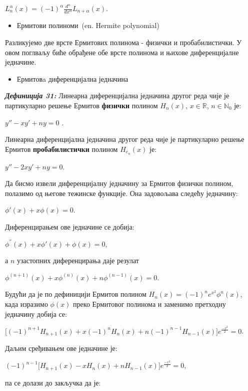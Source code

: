\(L_{n}^{\alpha}(x) = {( - 1)}^{\alpha}\frac{d^{\alpha}}{dx^{\alpha}}L_{n + \alpha}(x)\).

\begin{itemize}
\item
  Ермитови полиноми~(en. Hermite polynomial)
\end{itemize}

Разликујемо две врсте Ермитових полинома - физички и пробабилистички. У
овом поглваљу биће обрађене обе врсте полинома и њихове диференцијалне
једначине.

\begin{itemize}
\item
  Ермитовa диференцијална једначина
\end{itemize}

\emph{\textbf{Дефиниција 31:}} Линеарна диференцијална једначина другог
реда чије је партикуларно решење Ермитов \textbf{физички} полином
\(H_{n}(x)\), \(x\mathbb{\in R}\), \(n \in \mathbb{N}_{0}\) је:

\(y'' - xy' + ny = 0\) .

Линеарна диференцијална једначина другог реда чије је партикуларно
решење Ермитов \textbf{пробабилистички} полином \(H_{e_{n}}(x)\) је:

\(y'' - 2xy' + ny = 0\).

Да бисмо извели диференцијалну једначину за Ермитов физички полином,
полазимо од његове тежинске функције. Она задовољава следећу једначину:

\(\phi'(x) + x\phi(x) = 0\).

Диференцирањем ове једначине се добија:

\(\phi^{''}(x) + x\phi'(x) + \phi(x) = 0\),

а \(n\) узастопних диференцирања даје резулат

\(\phi^{(n + 1)}(x) + x\phi^{(n)}(x) + n\phi^{(n - 1)}(x) = 0\).

Будући да је по дефиницији Ермитов полином
\(H_{n}(x) = {( - 1)}^{n}e^{x^{2}}\phi^{n}(x)\), када изразимо
\(\phi(x)\) преко Ермитовог полинома и заменимо претходну једначину
добија се:

\(\lbrack{( - 1)}^{n + 1}H_{n + 1}(x) + x{( - 1)}^{n}H_{n}(x) + n{( - 1)}^{n - 1}H_{n - 1}(x)\rbrack e^{\frac{- x^{2}}{2}} = 0\).

Даљим сређивањем ове једначине је:

\({( - 1)}^{n - 1}\lbrack H_{n + 1}(x) - xH_{n}(x) + nH_{n - 1}(x)\rbrack e^{\frac{- x^{2}}{2}} = 0\),

па се долази до закључка да је:

